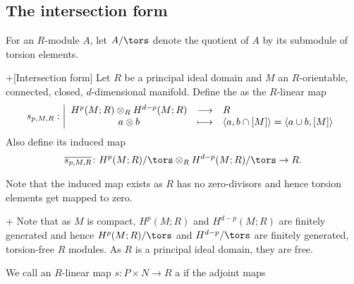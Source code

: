 \subsection{The intersection form}

\begin{notation}
  For an $R$-module  $A$, let  $A/\tors$ denote the quotient
  of $A$ by its submodule of torsion elements.
\end{notation}

\begin{definition}+[Intersection form]
  \label{def:intersection-form}
  Let $R$ be a  principal ideal domain and $M$ an  $R$-orientable,
  connected, closed,  $d$-dimensional manifold. 
  Define the  as the $R$-linear map 
    \begin{equation*}
    s_{p,M,R}: \left| \begin{array}{c c l} 
    H^p(M;R) \otimes _R H^{d-p}(M;R) & \longrightarrow & R \\
    a \otimes b& \longmapsto &  \left< a, b \cap [M] \right>
    = \left< a\cup b, [M] \right> 
    \end{array} \right.
  \end{equation*}
  Also define its induced map
  \[
    \overline{s_{p,M,R}}\colon  H^p(M;R)/\tors \otimes _R H^{d-p}(M;R)/\tors
    \to 
    R
  .\] 
\end{definition}
\begin{well-definedness}
  Note that the induced map exists as $R$ has no zero-divisors
  and hence torsion elements get mapped to zero.
\end{well-definedness}

\begin{remark}+
  Note that as $M$ is compact,  $H^p(M;R)$ and  $H^{d-p}(M;R)$ 
  are finitely generated and hence $H^p(M;R) / \tors$ and
  $H^{d-p} / \tors$ are finitely generated, torsion-free $R$ modules.
  As  $R$ is a  principal ideal domain, they are free.
\end{remark}

\begin{definition}
  We call an $R$-linear map  $s\colon P\times N \to R$ a 
  if the adjoint maps
\end{definition}

